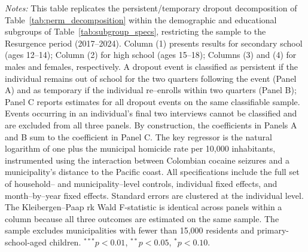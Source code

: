 \documentclass[12pt,letter,english,intoc,bibliography=totoc,index=totoc,BCOR10mm,captions=tableheading,nottitlepage,fleqn]{article}
\theoremstyle{break}
\begin{document}
\begin{table}[H]
\centering
\caption{Dropout Decomposition by Subgroup: Resurgence (2017--2024)}
\label{tab:perm_subgroups}
\centering
\scriptsize

\begin{minipage}{0.95\linewidth}
    \scriptsize \singlespacing
    \textit{Notes:} This table replicates the persistent/temporary dropout decomposition of Table~\ref{tab:perm_decomposition} within the demographic and educational subgroups of Table~\ref{tab:subgroup_specs}, restricting the sample to the Resurgence period (2017--2024). Column (1) presents results for secondary school (ages 12--14); Column (2) for high school (ages 15--18); Columns (3) and (4) for males and females, respectively. A dropout event is classified as persistent if the individual remains out of school for the two quarters following the event (Panel A) and as temporary if the individual re--enrolls within two quarters (Panel B); Panel C reports estimates for all dropout events on the same classifiable sample. Events occurring in an individual's final two interviews cannot be classified and are excluded from all three panels. By construction, the coefficients in Panels A and B sum to the coefficient in Panel C. The key regressor is the natural logarithm of one plus the municipal homicide rate per 10{,}000 inhabitants, instrumented using the interaction between Colombian cocaine seizures and a municipality's distance to the Pacific coast. All specifications include the full set of household-- and municipality--level controls, individual fixed effects, and month--by--year fixed effects. Standard errors are clustered at the individual level. The Kleibergen--Paap rk Wald F-statistic is identical across panels within a column because all three outcomes are estimated on the same sample. The sample excludes municipalities with fewer than 15{,}000 residents and primary-school-aged children. $^{***}p<0.01$, $^{**}p<0.05$, $^{*}p<0.10$.
    \end{minipage}
\end{table}
\end{document}
